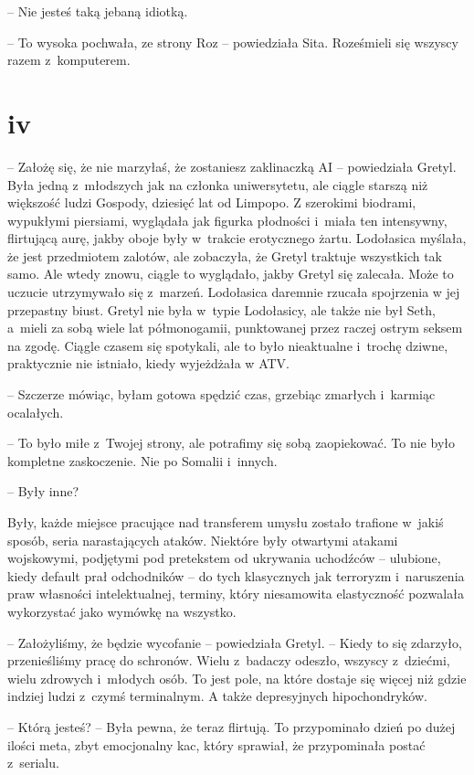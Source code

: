 \documentclass[oneside,polish,11pt,sfheadings]{mwbk}
\begin{document}
-- Nie jesteś taką jebaną idiotką.

-- To wysoka pochwała, ze strony Roz -- powiedziała Sita. Roześmieli się
wszyscy razem z~komputerem.

\chapter*{iv}

-- Założę się, że nie marzyłaś, że zostaniesz zaklinaczką AI -- powiedziała Gretyl. Była jedną z~młodszych jak na członka uniwersytetu,
ale ciągle starszą niż większość ludzi Gospody, dziesięć lat od Limpopo.
Z szerokimi biodrami, wypukłymi piersiami, wyglądała jak figurka
płodności i~miała ten intensywny, flirtującą aurę, jakby oboje były w~trakcie erotycznego żartu. Lodołasica myślała, że jest przedmiotem
zalotów, ale zobaczyła, że Gretyl traktuje wszystkich tak samo. Ale
wtedy znowu, ciągle to wyglądało, jakby Gretyl się zalecała. Może to
uczucie utrzymywało się z~marzeń. Lodołasica daremnie rzucała spojrzenia
w jej przepastny biust. Gretyl nie była w~typie Lodołasicy, ale także
nie był Seth, a~mieli za sobą wiele lat półmonogamii, punktowanej przez
raczej ostrym seksem na zgodę. Ciągle czasem się spotykali, ale to było
nieaktualne i~trochę dziwne, praktycznie nie istniało, kiedy wyjeżdżała
w ATV.

-- Szczerze mówiąc, byłam gotowa spędzić czas, grzebiąc zmarłych i~karmiąc ocalałych.

-- To było miłe z~Twojej strony, ale potrafimy się sobą zaopiekować. To
nie było kompletne zaskoczenie. Nie po Somalii i~innych.

-- Były inne?

Były, każde miejsce pracujące nad transferem umysłu zostało trafione w~jakiś sposób, seria narastających ataków. Niektóre były otwartymi
atakami wojskowymi, podjętymi pod pretekstem od ukrywania uchodźców -- ulubione, kiedy default prał odchodników -- do tych klasycznych jak
terroryzm i~naruszenia praw własności intelektualnej, terminy, który
niesamowita elastyczność pozwalała wykorzystać jako wymówkę na wszystko.

-- Założyliśmy, że będzie wycofanie -- powiedziała Gretyl. -- Kiedy to się
zdarzyło, przenieśliśmy pracę do schronów. Wielu z~badaczy odeszło,
wszyscy z~dziećmi, wielu zdrowych i~młodych osób. To jest pole, na które
dostaje się więcej niż gdzie indziej ludzi z~czymś terminalnym. A także
depresyjnych hipochondryków.

-- Którą jesteś? -- Była pewna, że teraz flirtują. To przypominało dzień
po dużej ilości meta, zbyt emocjonalny kac, który sprawiał, że
przypominała postać z~serialu.
\end{document}
